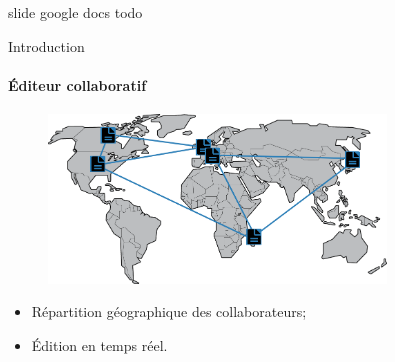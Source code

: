 \begin{frame}{slide google docs}
  todo
\end{frame}

\begin{frame}{Introduction}\framesubtitle{Éditeur collaboratif}
  \begin{figure}
    \begin{center}
      \includegraphics[width=0.8\textwidth]{img/world.png}
    \end{center}
  \end{figure}

  \begin{itemize}
  \item Répartition géographique des collaborateurs;
  \item Édition en temps réel.
  \end{itemize}
\end{frame}


